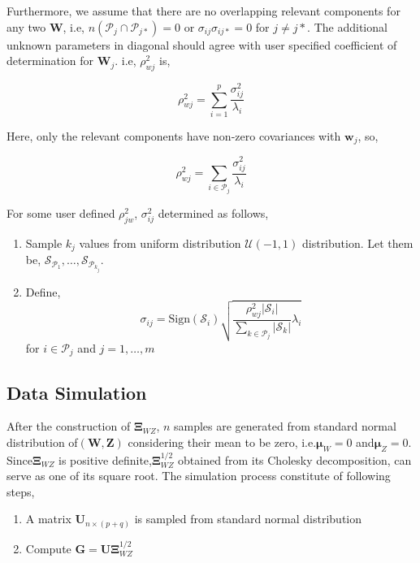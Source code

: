 \documentclass[12pt,A4paper,authoryear]{elsarticle} %
\providecommand{\tightlist}{%
  \setlength{\itemsep}{0pt}\setlength{\parskip}{0pt}}
\begin{document}
Furthermore, we assume that there are no overlapping relevant components
for any two \(\mathbf{W}\), i.e,
\(n\left(\mathcal{P}_j \cap \mathcal{P}_{j*}\right) = 0\) or
\(\sigma_{ij}\sigma_{ij*} = 0\) for \(j\ne j*\). The additional unknown
parameters in diagonal should agree with user specified coefficient of
determination for \(\mathbf{W}_j\). i.e, \(\rho_{wj}^2\) is,

\[
\rho_{wj}^2 = \sum_{i = 1}^p\frac{\sigma_{ij}^2}{\lambda_i}
\]

Here, only the relevant components have non-zero covariances with
\(\mathbf{w}_j\), so,

\[
\rho_{wj}^2 = \sum_{i \in \mathcal{P}_j}\frac{\sigma_{ij}^2}{\lambda_i}
\]

For some user defined \(\rho_{jw}^2\), \(\sigma_{ij}^2\) determined as
follows,

\begin{enumerate}
\def\labelenumi{\arabic{enumi})}
\tightlist
\item
  Sample \(k_j\) values from uniform distribution \(\mathcal{U}(-1, 1)\)
  distribution. Let them be,
  \(\mathcal{S}_{\mathcal{P}_1}, \ldots, \mathcal{S}_{\mathcal{P}_{k_j}}\).
\item
  Define,
  \[\sigma_{ij} = \text{Sign}\left(\mathcal{S}_i\right)\sqrt{\frac{\rho_{wj}^2\left|\mathcal{S}_i\right|}{\sum_{k\in \mathcal{P}_j}\left|\mathcal{S}_k\right|} \lambda_i}\]
  for \(i \in \mathcal{P}_j\) and \(j = 1, \ldots, m\)
\end{enumerate}

\subsection{Data Simulation}\label{data-simulation}

After the construction of \(\boldsymbol{\Xi}_{WZ}\), \(n\) samples are
generated from standard normal distribution
of\(\left(\mathbf{W}, \mathbf{Z} \right)\) considering their mean to be
zero, i.e.\(\boldsymbol{\mu}_W = 0\) and\(\boldsymbol{\mu}_Z=0\).
Since\(\boldsymbol{\Xi}_{WZ}\) is positive
definite,\(\boldsymbol{\Xi}_{WZ}^{1/2}\) obtained from its Cholesky
decomposition, can serve as one of its square root. The simulation
process constitute of following steps,

\begin{enumerate}
\def\labelenumi{\arabic{enumi})}
\tightlist
\item
  A matrix \(\mathbf{U}_{n\times (p + q)}\) is sampled from standard
  normal distribution
\item
  Compute \(\mathbf{G} = \boldsymbol{U\Xi}_{WZ}^{1/2}\)
\end{enumerate}
\end{document}
